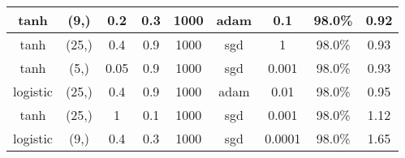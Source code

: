 \begin{table}[]
\begin{tabular}{|c|c|c|c|c|c|c|c|c|}
tanh                & (9,)                                                                           & 0.2                                                                  & 0.3               & 1000                                                                    & adam            & 0.1                & 98.0\%                                                               & 0.92                                                                                 \\ \hline
tanh                & (25,)                                                                          & 0.4                                                                  & 0.9               & 1000                                                                    & sgd             & 1                  & 98.0\%                                                               & 0.93                                                                                 \\ \hline
tanh                & (5,)                                                                           & 0.05                                                                 & 0.9               & 1000                                                                    & sgd             & 0.001              & 98.0\%                                                               & 0.93                                                                                 \\ \hline
logistic            & (25,)                                                                          & 0.4                                                                  & 0.9               & 1000                                                                    & adam            & 0.01               & 98.0\%                                                               & 0.95                                                                                 \\ \hline
tanh                & (25,)                                                                          & 1                                                                    & 0.1               & 1000                                                                    & sgd             & 0.001              & 98.0\%                                                               & 1.12                                                                                 \\ \hline
logistic            & (9,)                                                                           & 0.4                                                                  & 0.3               & 1000                                                                    & sgd             & 0.0001             & 98.0\%                                                               & 1.65                                                                                 \\ \hline
\end{tabular}
\label{tab:optimal-hyperparameters}
\end{table}